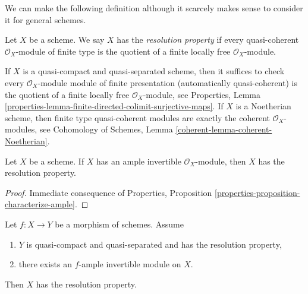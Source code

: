 \medskip\noindent
We can make the following definition although it scarcely makes
sense to consider it for general schemes.

\begin{definition}
\label{definition-resolution-property}
Let $X$ be a scheme. We say $X$ has the {\it resolution property}
if every quasi-coherent $\mathcal{O}_X$-module of finite type
is the quotient of a finite locally free $\mathcal{O}_X$-module.
\end{definition}

\noindent
If $X$ is a quasi-compact and quasi-separated scheme, then it suffices to check
every $\mathcal{O}_X$-module module of finite presentation (automatically
quasi-coherent) is the quotient of a finite locally free
$\mathcal{O}_X$-module, see Properties, Lemma
\ref{properties-lemma-finite-directed-colimit-surjective-maps}.
If $X$ is a Noetherian scheme, then finite type quasi-coherent modules
are exactly the coherent $\mathcal{O}_X$-modules, see
Cohomology of Schemes, Lemma \ref{coherent-lemma-coherent-Noetherian}.

\begin{lemma}
\label{lemma-resolution-property-ample}
Let $X$ be a scheme. If $X$ has an ample invertible $\mathcal{O}_X$-module,
then $X$ has the resolution property.
\end{lemma}

\begin{proof}
Immediate consequence of Properties, Proposition
\ref{properties-proposition-characterize-ample}.
\end{proof}

\begin{lemma}
\label{lemma-resolution-property-ample-relative}
Let $f : X \to Y$ be a morphism of schemes. Assume
\begin{enumerate}
\item $Y$ is quasi-compact and quasi-separated and has the resolution property,
\item there exists an $f$-ample invertible module on $X$.
\end{enumerate}
Then $X$ has the resolution property.
\end{lemma}


